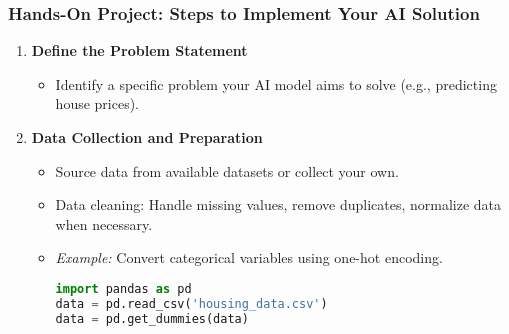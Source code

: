 \documentclass[aspectratio=169]{beamer}
\begin{document}
\begin{frame}[fragile]
    \frametitle{Hands-On Project: Steps to Implement Your AI Solution}
    \begin{enumerate}
        \item \textbf{Define the Problem Statement}
            \begin{itemize}
                \item Identify a specific problem your AI model aims to solve (e.g., predicting house prices).
            \end{itemize}
        \item \textbf{Data Collection and Preparation}
            \begin{itemize}
                \item Source data from available datasets or collect your own.
                \item Data cleaning: Handle missing values, remove duplicates, normalize data when necessary.
                \item \textit{Example:} Convert categorical variables using one-hot encoding.
                \begin{lstlisting}[language=Python]
import pandas as pd
data = pd.read_csv('housing_data.csv')
data = pd.get_dummies(data)
                \end{lstlisting}
            \end{itemize}
    \end{enumerate}
\end{frame}
\end{document}
